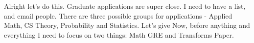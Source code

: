 \noindent {}

Alright let's do this. Graduate applications are super close. I need to have a list, and email people. There are three possible groups for applications - Applied Math, CS Theory, Probability and Statistics. Let's give Now, before anything and everything I need to focus on two things: Math GRE and Transforms Paper.